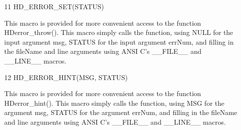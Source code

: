 \documentclass[11pt]{book}
\begin{document}
\begin{itemize}
\item[11] HD\_ERROR\_SET(STATUS)

This macro is provided for more convenient access to the function
HDerror\_throw(). This macro simply calls the function, using
NULL for the input argument msg, STATUS for the input argument
errNum, and filling in the fileName and line arguments using
ANSI C's \_\_FILE\_\_ and \_\_LINE\_\_ macros.

\item[12] HD\_ERROR\_HINT(MSG, STATUS)

This macro is provided for more convenient access to the function
HDerror\_hint(). This macro simply calls the function, using
MSG for the argument msg, STATUS for the argument errNum, and
filling in the fileName and line arguments using ANSI C's
\_\_FILE\_\_ and \_\_LINE\_\_ macros.

\end{itemize}
\end{document}
